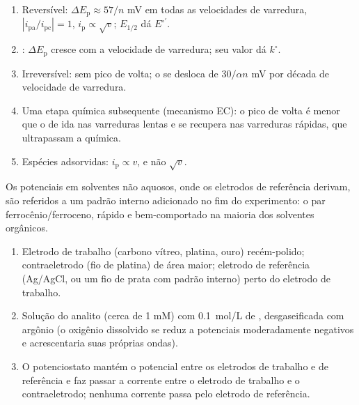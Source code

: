 \begin{method}\label{met:b3:electrode-kinetics:cv-diagnosis}
\begin{enumerate}
  \item Reversível: $\Delta E_{\mathrm p} \approx 57/n$ mV em todas as velocidades de varredura, $|i_{\mathrm{pa}}/i_{\mathrm{pc}}| = 1$, $i_{\mathrm p} \propto \sqrt v$;
        $E_{1/2}$ dá $E^{\circ\prime}$.
  \item {}: $\Delta E_{\mathrm p}$ cresce com a velocidade de varredura; seu valor dá $k^\circ$.
  \item Irreversível: sem pico de volta; o  se desloca de $30/\alpha n$ mV por
        década de velocidade de varredura.
  \item Uma etapa química subsequente (mecanismo EC): o pico de volta é menor que o
        de ida nas varreduras lentas e se recupera nas varreduras rápidas, que
        ultrapassam a química.
  \item Espécies adsorvidas: $i_{\mathrm p} \propto v$, e não $\sqrt v$.
\end{enumerate}
\end{method}

Os potenciais em solventes não aquosos, onde os eletrodos de referência derivam, são
referidos a um padrão interno adicionado no fim do experimento: o par
ferrocênio/ferroceno, rápido e bem-comportado na maioria dos solventes orgânicos.

\begin{method}\label{met:b3:electrode-kinetics:three-electrode}
\begin{enumerate}
  \item Eletrodo de trabalho (carbono vítreo, platina, ouro) recém-polido;
        contraeletrodo (fio de platina) de área maior; eletrodo de referência
        (Ag/AgCl, ou um fio de prata com padrão interno) perto do eletrodo de
        trabalho.
  \item Solução do analito (cerca de 1 mM) com \qty{0.1}{mol/L} de , desgaseificada com argônio (o oxigênio dissolvido se reduz a
        potenciais moderadamente negativos e acrescentaria suas próprias ondas).
  \item O potenciostato mantém o potencial entre os eletrodos de trabalho e de
        referência e faz passar a corrente entre o eletrodo de trabalho e o
        contraeletrodo; nenhuma corrente passa pelo eletrodo de referência.
\end{enumerate}
\end{method}

